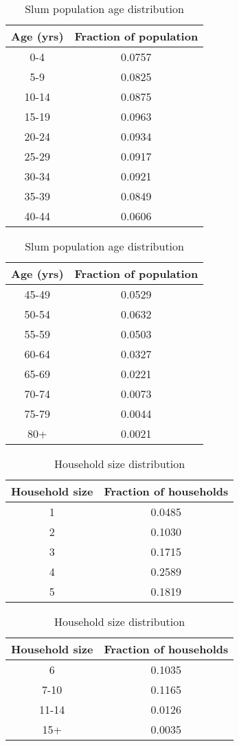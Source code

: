 \documentclass{article}
\theoremstyle{definition}
\begin{document}
\begin{table}
  \centering
    \small
    \caption{Slum population age distribution \label{Slum age}}
    \begin{tabular}{|c|c|}
      \hline
      {\bf Age (yrs)} & {\bf Fraction of population}\\
      \hline
      0-4 & 0.0757\\
      5-9 & 0.0825 \\ 
      10-14 & 0.0875\\
      15-19 & 0.0963 \\ 
      20-24 & 0.0934\\
      25-29 & 0.0917 \\ 
      30-34 & 0.0921\\
      35-39 & 0.0849 \\ 
      40-44 & 0.0606\\
      \hline
    \end{tabular}
    \quad
     \begin{tabular}{|c|c|}
      \hline
      {\bf Age (yrs)} & {\bf Fraction of population}\\
      \hline
      45-49 & 0.0529 \\ 
      50-54 & 0.0632\\
      55-59 & 0.0503 \\ 
      60-64 & 0.0327\\
      65-69 & 0.0221 \\ 
      70-74 & 0.0073\\
      75-79 & 0.0044 \\
      80+ & 0.0021\\
      \hline
    \end{tabular}
\end{table}



\begin{table}
  \centering
    \small
    \caption{Household size distribution \label{Household size}}
    \begin{tabular}{|c|c|}
      \hline
      {\bf Household size} & {\bf Fraction of households}\\
      \hline
      1 & 0.0485\\
      2 & 0.1030 \\ 
      3 & 0.1715\\
      4 & 0.2589 \\ 
      5 & 0.1819\\
      \hline
    \end{tabular}
    \quad
     \begin{tabular}{|c|c|}
      \hline
      {\bf Household size} & {\bf Fraction of households}\\
      \hline
      6 & 0.1035 \\ 
      7-10 & 0.1165\\
      11-14 & 0.0126 \\ 
      15+ & 0.0035\\
      \hline
    \end{tabular}
\end{table}
\end{document}
